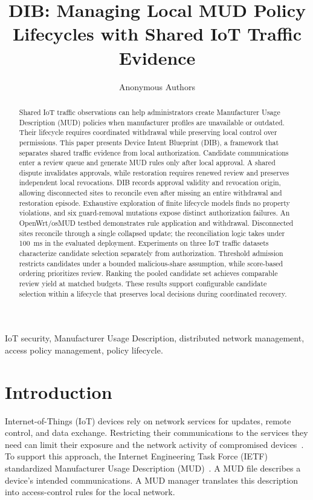 \documentclass[journal]{IEEEtran}
\theoremstyle{definition}
\begin{document}
\title{DIB: Managing Local MUD Policy Lifecycles with Shared IoT Traffic Evidence}
\author{Anonymous Authors}
\maketitle

\begin{abstract}
Shared IoT traffic observations can help administrators create Manufacturer Usage Description (MUD) policies when manufacturer profiles are unavailable or outdated. Their lifecycle requires coordinated withdrawal while preserving local control over permissions. This paper presents Device Intent Blueprint (DIB), a framework that separates shared traffic evidence from local authorization. Candidate communications enter a review queue and generate MUD rules only after local approval. A shared dispute invalidates approvals, while restoration requires renewed review and preserves independent local revocations. DIB records approval validity and revocation origin, allowing disconnected sites to reconcile even after missing an entire withdrawal and restoration episode. Exhaustive exploration of finite lifecycle models finds no property violations, and six guard-removal mutations expose distinct authorization failures. An OpenWrt/osMUD testbed demonstrates rule application and withdrawal. Disconnected sites reconcile through a single collapsed update; the reconciliation logic takes under 100~ms in the evaluated deployment. Experiments on three IoT traffic datasets characterize candidate selection separately from authorization. Threshold admission restricts candidates under a bounded malicious-share assumption, while score-based ordering prioritizes review. Ranking the pooled candidate set achieves comparable review yield at matched budgets. These results support configurable candidate selection within a lifecycle that preserves local decisions during coordinated recovery.
\end{abstract}

\begin{IEEEkeywords}
IoT security, Manufacturer Usage Description, distributed network management, access policy management, policy lifecycle.
\end{IEEEkeywords}

\section{Introduction}
\label{sec:introduction}
Internet-of-Things (IoT) devices rely on network services for updates, remote control, and data exchange. Restricting their communications to the services they need can limit their exposure and the network activity of compromised devices~\cite{mirai,hernandezramos2021mudreview}. To support this approach, the Internet Engineering Task Force (IETF) standardized Manufacturer Usage Description (MUD)~\cite{rfc8520}. A MUD file describes a device's intended communications. A MUD manager translates this description into access-control rules for the local network.
\end{document}

